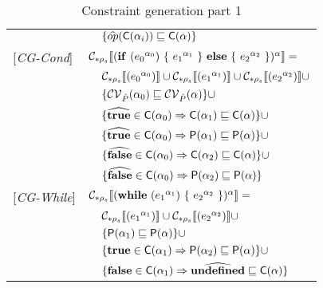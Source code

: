 \begin{table}[htb]
\begin{tabular}{l l l l}
&&\multicolumn{2}{l}{$\{ \widehat{op} (\mathsf{C}(\alpha_i)) \sqsubseteq \mathsf{C}(\alpha) \}$}\\
{[\textit{CG-Cond}]}&\multicolumn{3}{l}{$\mathcal{C}_{*\rho_s}\llbracket (\mathbf{if}\ ({e_0}^{\alpha_0})\ \{\ {e_1}^{\alpha_1}\ \}\ \mathbf{else}\ \{\ {e_2}^{\alpha_2}\ \})^\alpha \rrbracket = $}\\
&&\multicolumn{2}{l}{$ \mathcal{C}_{*\rho_s}\llbracket ({e_0}^{\alpha_0}) \rrbracket \cup \mathcal{C}_{*\rho_s}\llbracket ({e_1}^{\alpha_1}) \rrbracket \cup \mathcal{C}_{*\rho_s}\llbracket ({e_2}^{\alpha_2}) \rrbracket \cup$}\\
&&\multicolumn{2}{l}{$\{ \mathcal{CV}_{\hat{P}}(\alpha_0) \sqsubseteq \mathcal{CV}_{\hat{P}}(\alpha) \} \cup$} \\
&&\multicolumn{2}{l}{$\{ \widehat{\mathbf{true}} \in \mathsf{C}(\alpha_0) \Rightarrow \mathsf{C}(\alpha_1) \sqsubseteq \mathsf{C}(\alpha) \}\cup$}\\
&&\multicolumn{2}{l}{$\{ \widehat{\mathbf{true}} \in \mathsf{C}(\alpha_0) \Rightarrow \mathsf{P}(\alpha_1) \sqsubseteq \mathsf{P}(\alpha) \}\cup$} \\
&&\multicolumn{2}{l}{$\{ \widehat{\mathbf{false}} \in \mathsf{C}(\alpha_0) \Rightarrow \mathsf{C}(\alpha_2) \sqsubseteq \mathsf{C}(\alpha) \}\cup$}\\
&&\multicolumn{2}{l}{$\{ \widehat{\mathbf{false}} \in \mathsf{C}(\alpha_0) \Rightarrow \mathsf{P}(\alpha_2) \sqsubseteq \mathsf{P}(\alpha) \}$} \\
{[\textit{CG-While}]}&\multicolumn{3}{l}{$\mathcal{C}_{*\rho_s}\llbracket (\mathbf{while}\ ({e_1}^{\alpha_1})\ \{\ {e_2}^{\alpha_2}\ \})^\alpha \rrbracket = $}\\
&&\multicolumn{2}{l}{$ \mathcal{C}_{*\rho_s}\llbracket ({e_1}^{\alpha_1}) \rrbracket \cup \mathcal{C}_{*\rho_s}\llbracket ({e_2}^{\alpha_2}) \rrbracket \cup $}\\
&&\multicolumn{2}{l}{$\{ \mathsf{P}(\alpha_1) \sqsubseteq \mathsf{P}(\alpha) \} \cup$} \\
&&\multicolumn{2}{l}{$\{ \mathbf{true} \in \mathsf{C}(\alpha_1) \Rightarrow \mathsf{P}(\alpha_2) \sqsubseteq \mathsf{P}(\alpha)  \}\cup$}\\
&&\multicolumn{2}{l}{$\{ \mathbf{false} \in \mathsf{C}(\alpha_1) \Rightarrow \widehat{\mathbf{undefined}} \sqsubseteq \mathsf{C}(\alpha) \}$}\\
\end{tabular}
\caption{Constraint generation part 1}
\label{tab:ConstGen1}
\end{table}

